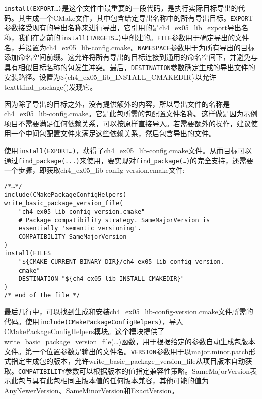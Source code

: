 \texttt{install(EXPORT…)}是这个文件中最重要的一段代码，是执行实际目标导出的代码。其生成一个CMake文件，其中包含给定导出名称中的所有导出目标。\texttt{EXPOR}T参数接受现有的导出名称来进行导出，它引用的是ch4\_ex05\_lib\_export导出名称，我们在之前的\texttt{install(TARGETS…)}中创建的。\texttt{FILE}参数用于确定导出的文件名，并设置为ch4\_ex05\_lib-config.cmake。\texttt{NAMESPACE}参数用于为所有导出的目标添加命名空间前缀。这允许将所有导出的目标连接到通用的命名空间下，并避免与具有相似目标名称的包发生冲突。最后，\texttt{DESTINATION}参数确定生成的导出文件的安装路径。设置为\$\{ch4\_ex05\_lib\_INSTALL\_CMAKEDIR\}以允许texttt{find\_package()}发现它。

\begin{tcolorbox}[colback=webgreen!5!white,colframe=webgreen!75!black,title=Note]
因为除了导出的目标之外，没有提供额外的内容，所以导出文件的名称是ch4\_ex05\_lib-config.cmake。它是此包所需的包配置文件名称。这样做是因为示例项目不需要满足任何依赖关系，可以按原样直接导入。若需要额外的操作，建议使用一个中间包配置文件来满足这些依赖关系，然后包含导出的文件。
\end{tcolorbox}

使用\texttt{install(EXPORT…)}，获得了ch4\_ex05\_lib-config.cmake文件。从而目标可以通过\texttt{find\_package(...)}来使用，要实现对\texttt{find\_package(…)}的完全支持，还需要一个步骤，即获取ch4\_ex05\_lib-config-version.cmake文件:

\begin{lstlisting}[style=styleCMake]
/*…*/
include(CMakePackageConfigHelpers)
write_basic_package_version_file(
	"ch4_ex05_lib-config-version.cmake"
	# Package compatibility strategy. SameMajorVersion is
	essentially 'semantic versioning'.
	COMPATIBILITY SameMajorVersion
)
install(FILES
	"${CMAKE_CURRENT_BINARY_DIR}/ch4_ex05_lib-config-version.
	cmake"
	DESTINATION "${ch4_ex05_lib_INSTALL_CMAKEDIR}"
)
/* end of the file */
\end{lstlisting}

最后几行中，可以找到生成和安装ch4\_ex05\_lib-config-version.cmake文件所需的代码。使用\texttt{include(CMakePackageConfigHelpers)}，导入CMakePackageConfigHelpers模块。这个模块提供了write\_basic\_package\_version\_file(…)函数，用于根据给定的参数自动生成包版本文件。第一个位置参数是输出的文件名。\texttt{VERSION}参数用于以major.minor.patch形式指定生成包的版本，允许write\_basic\_package\_version\_file从项目版本自动获取。\texttt{COMPATIBILITY}参数可以根据版本的值指定兼容性策略。SameMajorVersion表示此包与具有此包相同主版本值的任何版本兼容，其他可能的值为AnyNewerVersion、SameMinorVersion和ExactVersion。

